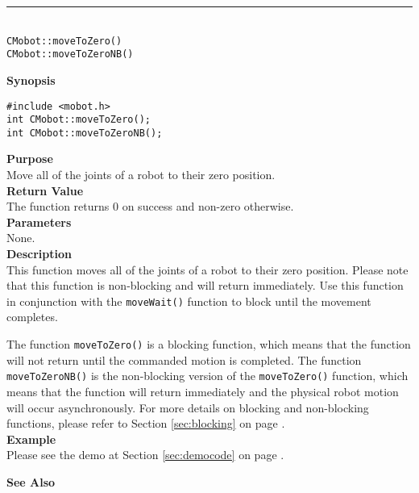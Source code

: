 \noindent
\vspace{5pt}
\rule{4.5in}{0.015in}\\
\noindent
{\LARGE \texttt{CMobot::moveToZero()}}\\
{\LARGE \texttt{CMobot::moveToZeroNB()}}\\
{}

\noindent
{\bf Synopsis}\\
\begin{verbatim}
#include <mobot.h>
int CMobot::moveToZero();
int CMobot::moveToZeroNB();
\end{verbatim}

\noindent
{\bf Purpose}\\
Move all of the joints of a robot to their zero position.\\

\noindent
{\bf Return Value}\\
The function returns 0 on success and non-zero otherwise.\\

\noindent
{\bf Parameters}\\
None.\\

\noindent
{\bf Description}\\
This function moves all of the joints of a robot to their zero position.
Please note that this function is non-blocking and will return immediately. Use
this function in conjunction with the \texttt{moveWait()} function to block
until the movement completes.

The function \texttt{moveToZero()} is a blocking function, which means that 
the function will not return until the commanded motion is 
completed. The function \texttt{moveToZeroNB()} is the non-blocking version of
the \texttt{moveToZero()} function, which means that the function will return
immediately and the physical robot motion will occur asynchronously. For
more details on blocking and non-blocking functions, please refer to 
Section \ref{sec:blocking} on page \pageref{sec:blocking}.\\

\noindent
{\bf Example}\\
Please see the demo at Section \ref{sec:democode} on page \pageref{sec:democode}.\\
\noindent

\noindent
{\bf See Also}\\

